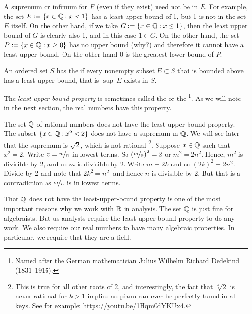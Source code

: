 A supremum or infimum for $E$ (even if they exist) need not be
in $E$.  For example, the set $E := \{ x \in {\mathbb{Q}} : x < 1 \}$ has a least upper
bound of 1, but 1 is not in the set $E$ itself.  On the other hand, if we
take $G := \{ x \in {\mathbb{Q}} : x \leq 1 \}$, then the least upper bound of $G$
is clearly also 1, and in this case $1 \in G$.  On the other hand,
the set $P := \{ x \in {\mathbb{Q}} : x \geq 0 \}$ has no upper bound (why?) and therefore
it cannot have a least upper bound.  On the other hand 0 is the greatest lower
bound of $P$.

\begin{defn} \label{defn:lub}
An ordered set $S$ has the \emph{} if
every nonempty
subset $E \subset S$ that is bounded above has a least upper bound,
that is $\sup\, E$ exists in $S$.
\end{defn}

The \emph{least-upper-bound property}
is sometimes called the \emph{} or the
\emph{}%
\footnote{%
Named after the German mathematician
\href{https://en.wikipedia.org/wiki/Richard_Dedekind}{Julius Wilhelm Richard Dedekind}
(1831--1916).}.
As we will note in the
next section, the real numbers have this property.

\begin{example}
The set ${\mathbb{Q}}$ of rational numbers does not have the least-upper-bound property.  The subset
$\{ x \in {\mathbb{Q}} : x^2 < 2 \}$ does not have a supremum in ${\mathbb{Q}}$.  We will
see later that the supremum is 
$\sqrt{2}$, which is not rational%
\footnote{This is true for all other roots of 2, and interestingly,
the fact that $\sqrt[k]{2}$ is never rational for $k > 1$ implies no piano can
ever be perfectly tuned in all keys.  See for example:
\url{https://youtu.be/1Hqm0dYKUx4}.}.
Suppose $x \in {\mathbb{Q}}$ such that $x^2 = 2$.
Write $x=\nicefrac{m}{n}$ in lowest terms.  So ${(\nicefrac{m}{n})}^2 = 2$
or
$m^2 = 2n^2$.  Hence, $m^2$ is divisible by 2, and so $m$ is divisible by
2.  Write $m = 2k$ and so ${(2k)}^2 = 2n^2$.  Divide by 2
and note that $2k^2 = n^2$, and hence $n$ is divisible by 2.  But that is a
contradiction as $\nicefrac{m}{n}$ is in lowest terms.
\end{example}

That ${\mathbb{Q}}$ does not have the least-upper-bound property is one of the most
important reasons why we work with ${\mathbb{R}}$ in analysis.  The set ${\mathbb{Q}}$
is just fine for algebraists.  But us analysts require the least-upper-bound
property to do any work.
We also require our real numbers to have many algebraic properties.  In
particular, we require that they are a field.


